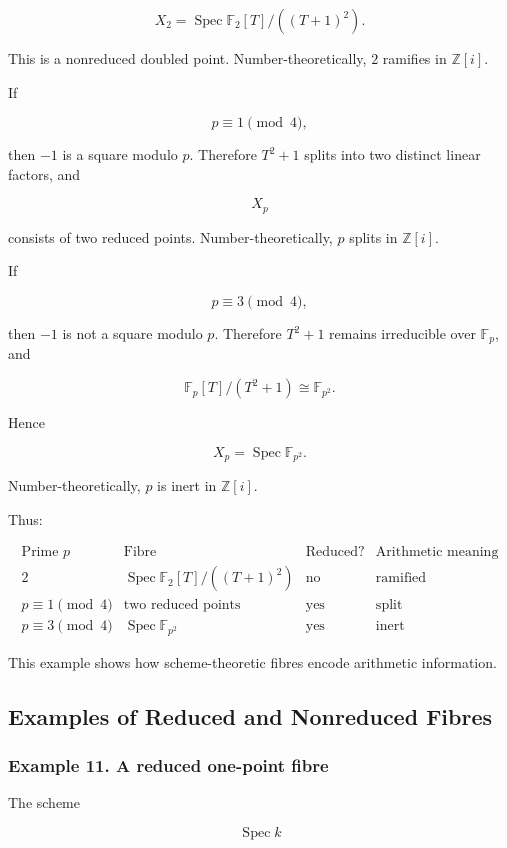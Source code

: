 \documentclass[12pt,a4paper]{article}
\theoremstyle{notespace}
\begin{document}
\[
X_2=\operatorname{Spec}\mathbb{F}_2[T]/((T+1)^2).
\]

This is a nonreduced doubled point. Number-theoretically, \(2\) ramifies in \(\mathbb{Z}[i]\).

If

\[
p\equiv 1\pmod 4,
\]

then \(-1\) is a square modulo \(p\). Therefore \(T^2+1\) splits into two distinct linear factors, and

\[
X_p
\]

consists of two reduced points. Number-theoretically, \(p\) splits in \(\mathbb{Z}[i]\).

If

\[
p\equiv 3\pmod 4,
\]

then \(-1\) is not a square modulo \(p\). Therefore \(T^2+1\) remains irreducible over \(\mathbb{F}_p\), and

\[
\mathbb{F}_p[T]/(T^2+1)\cong \mathbb{F}_{p^2}.
\]

Hence

\[
X_p=\operatorname{Spec}\mathbb{F}_{p^2}.
\]

Number-theoretically, \(p\) is inert in \(\mathbb{Z}[i]\).

Thus:

\[
\begin{array}{c|c|c|c}
	\text{Prime }p & \text{Fibre} & \text{Reduced?} & \text{Arithmetic meaning} \\
	\hline
	2 & \operatorname{Spec}\mathbb{F}_2[T]/((T+1)^2) & \text{no} & \text{ramified} \\
	p\equiv 1\pmod 4 & \text{two reduced points} & \text{yes} & \text{split} \\
	p\equiv 3\pmod 4 & \operatorname{Spec}\mathbb{F}_{p^2} & \text{yes} & \text{inert}
\end{array}
\]

This example shows how scheme-theoretic fibres encode arithmetic information.

\subsection{Examples of Reduced and Nonreduced Fibres}

\subsubsection{Example 11. A reduced one-point fibre}

The scheme

\[
\operatorname{Spec}k
\]
\end{document}
